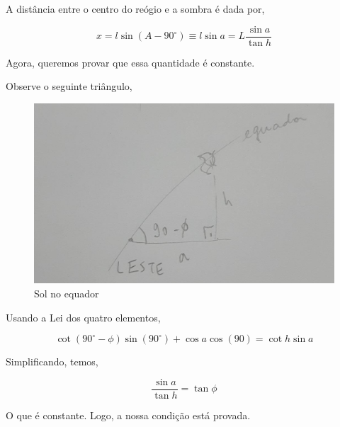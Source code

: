 \documentclass[11pt]{article}
\begin{document}
\begin{pproblem}
\begin{pssolution*}{}{}
\begin{alternativas}
            A distância entre o centro do reógio e a sombra é dada por,

            \[x = l\sin (A-90^{\circ})\equiv l\sin a = L\frac{\sin a}{\tan h}\]

            Agora, queremos provar que essa quantidade é constante.

            \item Observe o seguinte triângulo, 
            
            \begin{figure}[H]
                \centering
                \includegraphics[width=0.5\linewidth]{imagens/trigesf1.jpg}
                \caption{Sol no equador}
            \end{figure}

            Usando a Lei dos quatro elementos, 

            \[\cot(90^\circ -\phi)\sin(90^{\circ})+\cos a \cos(90) = \cot h \sin a\]

            Simplificando, temos, 

            \[\frac{\sin a}{\tan h } = \tan {\phi}\]

            O que é constante. Logo, a nossa condição está provada.
            

        \end{alternativas}
    \end{pssolution*}
    \end{pproblem}
\end{document}
